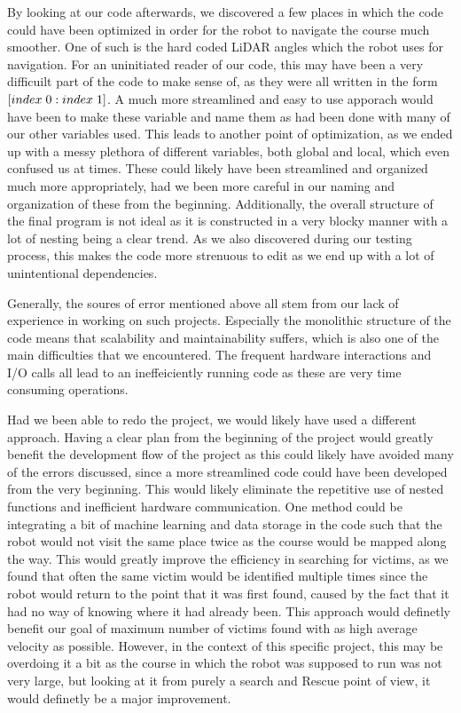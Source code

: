 \documentclass[conference]{IEEEtran}
\begin{document}
By looking at our code afterwards, we discovered a few places in which the code could have been optimized in order for the robot to navigate the course much smoother.
One of such is the hard coded LiDAR angles which the robot uses for navigation. For an uninitiated reader of our code, this may have been a very difficuilt part of the code to make sense of, as they were all written in the form $[index \hspace{1mm} 0: index \hspace{1mm} 1]$.
A much more streamlined and easy to use apporach would have been to make these variable and name them as had been done with many of our other variables used.
This leads to another point of optimization, as we ended up with a messy plethora of different variables, both global and local, which even confused us at times. These could likely have been streamlined and organized much more appropriately, had we been more careful in our naming and organization of these from the beginning.
Additionally, the overall structure of the final program is not ideal as it is constructed in a very blocky manner with a lot of nesting being a clear trend. As we also discovered during our testing process, this makes the code more strenuous to edit as we end up with a lot of unintentional dependencies.

Generally, the soures of error mentioned above all stem from our lack of experience in working on such projects. Especially the monolithic structure of the code means that scalability and maintainability suffers, which is also one of the main difficulties that we encountered.
The frequent hardware interactions and I/O calls all lead to an ineffeiciently running code as these are very time consuming operations.

Had we been able to redo the project, we would likely have used a different approach.
Having a clear plan from the beginning of the project would greatly benefit the development flow of the project as this could likely have avoided many of the errors discussed, since a more streamlined code could have been developed from the very beginning.
This would likely eliminate the repetitive use of nested functions and inefficient hardware communication.
One method could be integrating a bit of machine learning and data storage in the code such that the robot would not visit the same place twice as the course would be mapped along the way. This would greatly improve the efficiency in searching for victims, as we found that often the same victim would be identified multiple times since the robot would return to the point that it was first found, caused by the fact that it had no way of knowing where it had already been.
This approach would definetly benefit our goal of maximum  number of victims found with as high average velocity as possible.
However, in the context of this specific project, this may be overdoing it a bit as the course in which the robot was supposed to run was not very large, but looking at it from purely a search and Rescue point of view, it would definetly be a major improvement.
\end{document}
